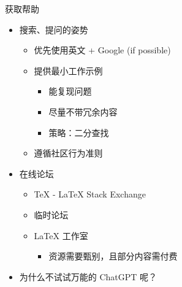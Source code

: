 \begin{frame}{获取帮助}
\begin{itemize}
  \item<+-> 搜索、提问的姿势

    \begin{itemize}
      \item 优先使用英文 + Google (if possible)
      \item 提供最小工作示例
        \begin{itemize}
          \item 能复现问题
          \item 尽量不带冗余内容
          \item 策略：二分查找
        \end{itemize}
      \item 遵循社区行为准则
    \end{itemize}

  \item<+-> 在线论坛

    \begin{itemize}
      \item \TeX{} - \LaTeX{} Stack Exchange 
      \item \CTeX{} 临时论坛 
      \item \LaTeX{} 工作室 
        \begin{itemize}
          \item 资源需要甄别，且部分内容需付费
        \end{itemize}
    \end{itemize}

  \item<+-> 为什么不试试万能的 ChatGPT 呢？
\end{itemize}
\end{frame}

